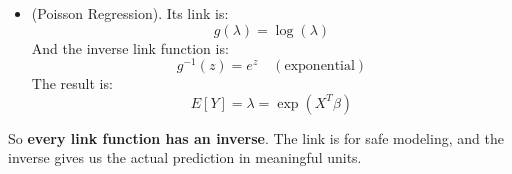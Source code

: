\begin{itemize}
    \item {} (Poisson Regression). Its link is:
    \begin{equation*}
        g(\lambda) = \log(\lambda)
    \end{equation*}
    And the inverse link function is:
    \begin{equation}
        g^{-1}(z) = e^z \quad (\text{exponential})
    \end{equation}
    The result is:
    \begin{equation*}
        E[Y] = \lambda = \exp(X^T \beta)
    \end{equation*}
\end{itemize}
So \textbf{every link function has an inverse}. The link is for safe modeling, and the inverse gives us the actual prediction in meaningful units.